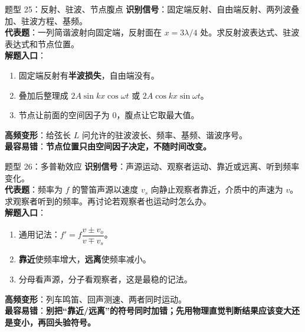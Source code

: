 \documentclass[11pt,a4paper]{ctexart}
\newcommand{\key}[1]{\textcolor{theme}{\textbf{#1}}}
\newcommand{\warn}[1]{\textcolor{red!70!black}{\textbf{#1}}}
\begin{document}
\begin{typebox}{题型 25：反射、驻波、节点腹点}
\textbf{识别信号}：固定端反射、自由端反射、两列波叠加、驻波方程、基频。\\
\textbf{代表题}：一列简谐波射向固定端，反射面在 \(x=3\lambda/4\) 处。求反射波表达式、驻波表达式和节点位置。\\
\textbf{解题入口}：
\begin{enumerate}
  \item 固定端反射有\key{半波损失}，自由端没有。
  \item 叠加后整理成 \(2A\sin kx\cos\omega t\) 或 \(2A\cos kx\sin\omega t\)。
  \item 节点让前面的空间因子为 0，腹点让它取最大值。
\end{enumerate}
\textbf{高频变形}：给弦长 \(L\) 问允许的驻波波长、频率、基频、谐波序号。\\
\textbf{最容易错}：\warn{节点位置只由空间因子决定，不随时间改变。}
\end{typebox}

\begin{typebox}{题型 26：多普勒效应}
\textbf{识别信号}：声源运动、观察者运动、靠近或远离、听到频率变化。\\
\textbf{代表题}：频率为 \(f\) 的警笛声源以速度 \(v_s\) 向静止观察者靠近，介质中的声速为 \(v\)。求观察者听到的频率。再讨论若观察者也运动时怎么办。\\
\textbf{解题入口}：
\begin{enumerate}
  \item 通用记法：\(f'=f\dfrac{v\pm v_o}{v\mp v_s}\)。
  \item \key{靠近}使频率增大，\key{远离}使频率减小。
  \item 分母看声源，分子看观察者，这是最稳的记法。
\end{enumerate}
\textbf{高频变形}：列车鸣笛、回声测速、两者同时运动。\\
\textbf{最容易错}：\warn{别把“靠近/远离”的符号同时加错；先用物理直觉判断结果应该变大还是变小，再回头验符号。}
\end{typebox}

\begin{center}
\end{center}
\end{document}
